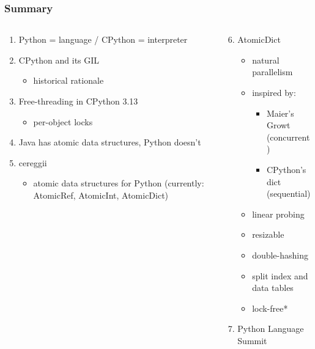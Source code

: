 \documentclass[aspectratio=169]{beamer}
\begin{document}
\begin{frame}
    \frametitle{Summary}

    \begin{columns}
        \begin{column}{0.5\textwidth}
            \begin{enumerate}
                \item Python = language / CPython = interpreter
                \item CPython and its GIL
                \begin{itemize}
                    \item historical rationale
                \end{itemize}
                \item Free-threading in CPython 3.13
                \begin{itemize}
                    \item per-object locks
                \end{itemize}
                \item Java has atomic data structures, Python doesn't
                \item cereggii
                \begin{itemize}
                    \item atomic data structures for Python (currently: AtomicRef, AtomicInt, AtomicDict)
                \end{itemize}
            \end{enumerate}
        \end{column}
        \begin{column}{0.5\textwidth}
            \begin{enumerate}
                \setcounter{enumi}{5}
                \item AtomicDict
                \begin{itemize}
                    \item natural parallelism
                    \item inspired by:
                    \begin{itemize}
                        \item Maier's Growt (concurrent)
                        \item CPython's dict (sequential)
                    \end{itemize}
                    \item linear probing
                    \item resizable
                    \item double-hashing
                    \item split index and data tables
                    \item lock-free*
                \end{itemize}
                \item Python Language Summit
            \end{enumerate}
        \end{column}
    \end{columns}
\end{frame}
\end{document}
